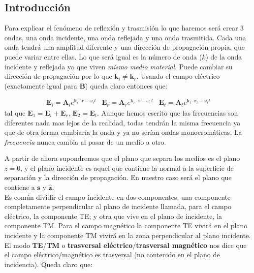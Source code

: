 \documentclass[12pt]{article}
\newcommand{\Bn}{\mathbf{B}}
\newcommand{\En}{\mathbf{E}}
\newcommand{\kn}{\mathbf{k}}
\newcommand{\rn}{\mathbf{r}}
\newcommand{\An}{\mathbf{A}}
\newcommand{\sn}{\mathbf{s}}
\newcommand{\hnz}{\hat{\mathbf{z}}}
\numberwithin{equation}{section}
\numberwithin{figure}{section}
\begin{document}
\subsection{Introducción}

Para explicar el fenómeno de reflexión y trasmisión lo que haremos será crear 3 ondas, una onda incidente, una onda reflejada y una onda trasmitida. Cada una onda tendrá una amplitud diferente y una dirección de propagación propia, que puede variar entre ellas. Lo que será igual es la número de onda ($k$) de la onda incidente y reflejada ya que viven \textit{mismo medio material}. Puede cambiar su dirección de propagación por lo que $\kn_i \neq \kn_r$.  Usando el campo eléctrico (exactamente igual para $\Bn$) queda claro entonces que:

\begin{subequations}
\begin{align}
\En_i = \An_i e^{\kn_i \cdot \rn - \omega_i t}
\end{align}
\begin{align}
\En_r = \An_r e^{\kn_r \cdot \rn - \omega_r t}
\end{align}
\begin{align}
\En_t = \An_t e^{\kn_t \cdot \rn_t - \omega_t t}
\end{align}
\end{subequations}
tal que $\En_1 = \En_i  + \En_r$, $\En_2 = \En_t$.  Aunque hemos escrito que las frecuencias son diferentes nada mas lejos de la realidad, todas tendrán la misma frecuencia ya que de otra forma cambiaría la onda y ya no serían ondas monocromáticas. La \textit{frecuencia} nunca cambia al pasar de un medio a otro. 



A partir de ahora supondremos que el plano que separa los medios es el plano $z=0$, y el plano incidente es aquel que contiene la normal a la superficie de separación y la dirección de propagación. En nuestro caso será el plano que contiene a $\sn$ y $\hnz$. \\

Es común dividir el campo incidente en dos componentes: una componente completamente perpendicular al plano de incidente llamada, para el campo eléctrico, la componente TE; y otra que vive en el plano de incidente, la componente TM. Para el campo magnético la componente TE vivirá en el plano incidente y la componente TM vivirá en la zona perpendicular al plano incidente. El modo \textbf{TE}/\textbf{TM} o \textbf{trasversal eléctrico}/\textbf{trasversal magnético} nos dice que el campo eléctrico/magnético es trasversal (no contenido en el plano de incidencia). Queda claro que:
\end{document}
